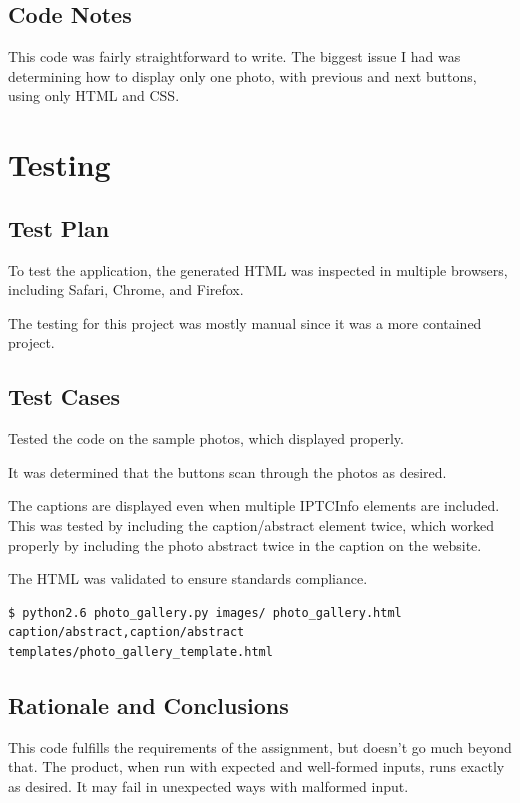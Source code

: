 \documentclass[11pt,letterpaper]{article}
\begin{document}
\subsection{Code Notes}
This code was fairly straightforward to write. The biggest issue I had was determining how to display only one photo, with previous and next buttons, using only HTML and CSS.

\section{Testing}

\subsection{Test Plan}
To test the application, the generated HTML was inspected in multiple browsers, including Safari, Chrome, and Firefox.

The testing for this project was mostly manual since it was a more contained project.
\subsection{Test Cases}
Tested the code on the sample photos, which displayed properly.

It was determined that the buttons scan through the photos as desired.

The captions are displayed even when multiple IPTCInfo elements are included. This was tested by including the caption/abstract element twice, which worked properly by including the photo abstract twice in the caption on the website.

The HTML was validated to ensure standards compliance.
\begin{verbatim}
$ python2.6 photo_gallery.py images/ photo_gallery.html caption/abstract,caption/abstract 
templates/photo_gallery_template.html
\end{verbatim}

\subsection{Rationale and Conclusions}
This code fulfills the requirements of the assignment, but doesn't go much beyond that. The product, when run with expected and well-formed inputs, runs exactly as desired. It may fail in unexpected ways with malformed input.
\end{document}
